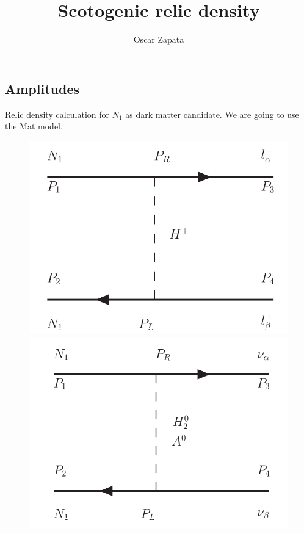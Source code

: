 \documentclass[12pt,letterpaper]{article}
\title{Scotogenic relic density}
\author{Oscar Zapata}
\begin{document}
\maketitle

\subsection{Amplitudes}


Relic density calculation for $N_1$ as dark matter candidate. We are going to use the Mat model.

\begin{figure}
 
 	\begin{center}
    \includegraphics[scale=0.4]{1.png} 
    \includegraphics[scale=0.4]{2.png} \\

\end{center}
\end{figure}
\end{document}

